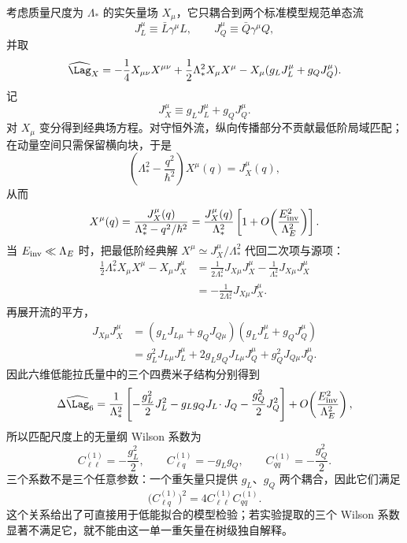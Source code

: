 \begin{exbox}[重单态矢量场的树级匹配]
考虑质量尺度为 $\Lambda_*$ 的实矢量场 $X_\mu$，它只耦合到两个标准模型规范单态流
\begin{equation*}
J_L^\mu\equiv\bar L\gamma^\mu L,
\qquad
J_Q^\mu\equiv\bar Q\gamma^\mu Q,
\end{equation*}
并取
\begin{equation}
\widehat\Lag_X
=-\frac14X_{\mu\nu}X^{\mu\nu}
+\frac12\Lambda_*^2X_\mu X^\mu
-X_\mu(g_LJ_L^\mu+g_QJ_Q^\mu).
\label{eq:heavy-vector-uv-lag-dp13}
\end{equation}
记
\begin{equation*}
J_X^\mu\equiv g_LJ_L^\mu+g_QJ_Q^\mu.
\end{equation*}
对 $X_\mu$ 变分得到经典场方程。对守恒外流，纵向传播部分不贡献最低阶局域匹配；在动量空间只需保留横向块，于是
\begin{equation*}
\left(\Lambda_*^2-\frac{q^2}{\hbar^2}\right)X^\mu(q)=J_X^\mu(q),
\end{equation*}
从而
\begin{equation*}
X^\mu(q)
=\frac{J_X^\mu(q)}{\Lambda_*^2-q^2/\hbar^2}
=\frac{J_X^\mu(q)}{\Lambda_*^2}
\left[1+O\!\left(\frac{E_{\rm inv}^2}{\Lambda_E^2}\right)\right].
\end{equation*}
当 $E_{\rm inv}\ll\Lambda_E$ 时，把最低阶经典解 $X^\mu\simeq J_X^\mu/\Lambda_*^2$ 代回二次项与源项：
\begin{align*}
\frac12\Lambda_*^2X_\mu X^\mu-X_\mu J_X^\mu
&=\frac{1}{2\Lambda_*^2}J_{X\mu}J_X^\mu
-\frac{1}{\Lambda_*^2}J_{X\mu}J_X^\mu\\
&=-\frac{1}{2\Lambda_*^2}J_{X\mu}J_X^\mu.
\end{align*}
再展开流的平方，
\begin{align*}
J_{X\mu}J_X^\mu
&=(g_LJ_{L\mu}+g_QJ_{Q\mu})
  (g_LJ_L^\mu+g_QJ_Q^\mu)\\
&=g_L^2J_{L\mu}J_L^\mu
 +2g_Lg_QJ_{L\mu}J_Q^\mu
 +g_Q^2J_{Q\mu}J_Q^\mu.
\end{align*}
因此六维低能拉氏量中的三个四费米子结构分别得到
\begin{equation*}
\Delta\widehat\Lag_6
=\frac1{\Lambda_*^2}
\left[
-\frac{g_L^2}{2}J_L^2
-g_Lg_QJ_L\!\cdot J_Q
-\frac{g_Q^2}{2}J_Q^2
\right]
+O\!\left(\frac{E_{\rm inv}^2}{\Lambda_E^2}\right),
\end{equation*}
所以匹配尺度上的无量纲 Wilson 系数为
\begin{equation}
\boxed{
C_{\ell\ell}^{(1)}=-\frac{g_L^2}{2},
\qquad
C_{\ell q}^{(1)}=-g_Lg_Q,
\qquad
C_{qq}^{(1)}=-\frac{g_Q^2}{2}.}
\label{eq:heavy-vector-wilson-matching-dp13}
\end{equation}
三个系数不是三个任意参数：一个重矢量只提供 $g_L$、$g_Q$ 两个耦合，因此它们满足
\begin{equation*}
\bigl(C_{\ell q}^{(1)}\bigr)^2
=4C_{\ell\ell}^{(1)}C_{qq}^{(1)}.
\end{equation*}
这个关系给出了可直接用于低能拟合的模型检验；若实验提取的三个 Wilson 系数显著不满足它，就不能由这一单一重矢量在树级独自解释。
\end{exbox}

